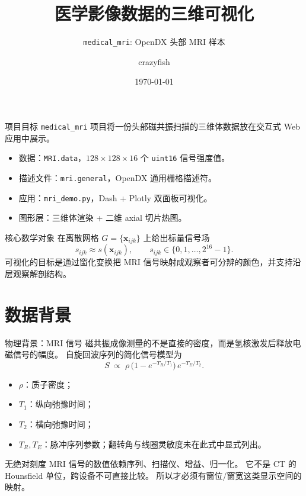 \documentclass[aspectratio=169,11pt]{ctexbeamer}
\title{医学影像数据的三维可视化}
\subtitle{\texttt{medical\_mri}: OpenDX 头部 MRI 样本}
\author{crazyfish}
\date{\today}
\newcommand{\vx}{\mathbf x}
\begin{document}
\begin{frame}
  \titlepage
\end{frame}

\begin{frame}{项目目标}
  \texttt{medical\_mri} 项目将一份头部磁共振扫描的三维体数据放在交互式 Web 应用中展示。

  \begin{itemize}
    \item 数据：\texttt{MRI.data}，$128\times 128\times 16$ 个 \texttt{uint16} 信号强度值。
    \item 描述文件：\texttt{mri.general}，OpenDX 通用栅格描述符。
    \item 应用：\texttt{mri\_demo.py}，Dash + Plotly 双面板可视化。
    \item 图形层：三维体渲染 + 二维 axial 切片热图。
  \end{itemize}

  \begin{block}{核心数学对象}
    在离散网格 $G=\{\vx_{ijk}\}$ 上给出标量信号场
    \[
      s_{ijk}\approx s(\vx_{ijk}),\qquad
      s_{ijk}\in\{0,1,\dots,2^{16}-1\}.
    \]
    可视化的目标是通过窗化变换把 MRI 信号映射成观察者可分辨的颜色，并支持沿层观察解剖结构。
  \end{block}
\end{frame}

\section{数据背景}

\begin{frame}{物理背景：MRI 信号}
  \small
  磁共振成像测量的不是直接的密度，而是氢核激发后释放电磁信号的幅度。
  自旋回波序列的简化信号模型为
  \[
    S\;\propto\;\rho\,\bigl(1-e^{-T_R/T_1}\bigr)\,e^{-T_E/T_2}.
  \]

  \begin{itemize}
    \item $\rho$：质子密度；
    \item $T_1$：纵向弛豫时间；
    \item $T_2$：横向弛豫时间；
    \item $T_R, T_E$：脉冲序列参数；翻转角与线圈灵敏度未在此式中显式列出。
  \end{itemize}

  \begin{block}{无绝对刻度}
    MRI 信号的数值依赖序列、扫描仪、增益、归一化。
    它不是 CT 的 Hounsfield 单位，跨设备不可直接比较。
    所以才必须有窗位/窗宽这类显示空间的映射。
  \end{block}
\end{frame}
\end{document}
